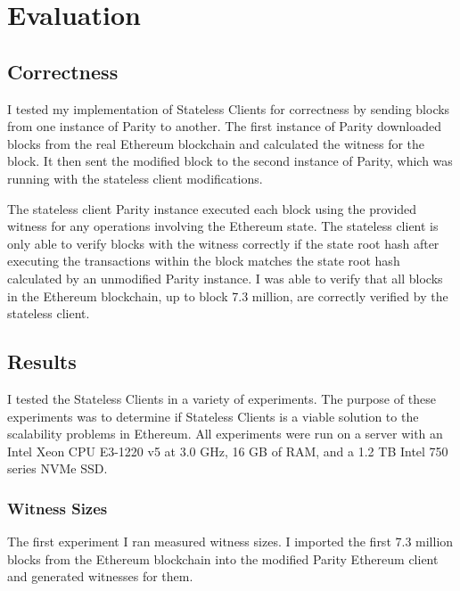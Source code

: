 \documentclass[12pt]{article}
\newcommand{\System}{Stateless Clients\xspace}
\begin{document}
\section{Evaluation}

\subsection{Correctness}

I tested my implementation of \System for correctness by sending blocks from one instance of Parity to another. The first instance of Parity downloaded blocks from the real Ethereum blockchain and calculated the witness for the block. It then sent the modified block to the second instance of Parity, which was running with the stateless client modifications.

The stateless client Parity instance executed each block using the provided witness for any operations involving the Ethereum state. The stateless client is only able to verify blocks with the witness correctly if the state root hash after executing the transactions within the block matches the state root hash calculated by an unmodified Parity instance. I was able to verify that all blocks in the Ethereum blockchain, up to block 7.3 million, are correctly verified by the stateless client.

\subsection{Results} \label{subsection:results}

I tested the \System in a variety of experiments. The purpose of these experiments was to determine if \System is a viable solution to the scalability problems in Ethereum. All experiments were run on a server with an Intel Xeon CPU E3-1220 v5 at 3.0 GHz, 16 GB of RAM, and a 1.2 TB Intel 750 series NVMe SSD.

\subsubsection{Witness Sizes}

The first experiment I ran measured witness sizes. I imported the first 7.3 million blocks from the Ethereum blockchain into the modified Parity Ethereum client and generated witnesses for them.
\end{document}
